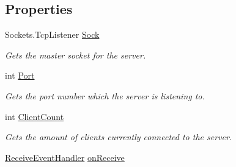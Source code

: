 \subsection*{Properties}
\begin{DoxyCompactItemize}
\item 
\hypertarget{classAsterion_1_1Server_a87ced81e227ec21a28bfa3d2197b528e}{Sockets.\-Tcp\-Listener \hyperlink{classAsterion_1_1Server_a87ced81e227ec21a28bfa3d2197b528e}{Sock}}\label{classAsterion_1_1Server_a87ced81e227ec21a28bfa3d2197b528e}

\begin{DoxyCompactList}\small\item\em Gets the master socket for the server. \end{DoxyCompactList}\item 
\hypertarget{classAsterion_1_1Server_aa2820cd7ab117d9b0e624fb7c1ef762e}{int \hyperlink{classAsterion_1_1Server_aa2820cd7ab117d9b0e624fb7c1ef762e}{Port}}\label{classAsterion_1_1Server_aa2820cd7ab117d9b0e624fb7c1ef762e}

\begin{DoxyCompactList}\small\item\em Gets the port number which the server is listening to. \end{DoxyCompactList}\item 
\hypertarget{classAsterion_1_1Server_ac97d971691db223ceaec7967cb5f45f0}{int \hyperlink{classAsterion_1_1Server_ac97d971691db223ceaec7967cb5f45f0}{Client\-Count}}\label{classAsterion_1_1Server_ac97d971691db223ceaec7967cb5f45f0}

\begin{DoxyCompactList}\small\item\em Gets the amount of clients currently connected to the server. \end{DoxyCompactList}\item 
\hypertarget{classAsterion_1_1Server_a3ee739feda817d707efc0ae731725401}{\hyperlink{namespaceAsterion_a8df76ce0b97fca73a25888bd3b8cf7df}{Receive\-Event\-Handler} \hyperlink{classAsterion_1_1Server_a3ee739feda817d707efc0ae731725401}{on\-Receive}}\label{classAsterion_1_1Server_a3ee739feda817d707efc0ae731725401}


\end{DoxyCompactItemize}
